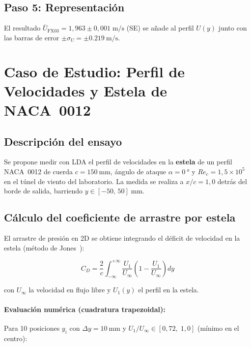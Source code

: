 \documentclass[12pt,a4paper]{article}
\begin{document}
\subsection{Paso 5: Representación}

El resultado $\bar{U}_\mathrm{FX03} = 1{,}963 \pm 0{,}001\;\si{\m\per\s}$
(SE) se añade al perfil $U(y)$ junto con las barras de error
$\pm\sigma_U = \pm\SI{0,219}{\m\per\s}$.

\section{Caso de Estudio: Perfil de Velocidades y Estela de NACA~0012}
\label{sec:caso_estudio}

\subsection{Descripción del ensayo}

Se propone medir con LDA el perfil de velocidades en la \textbf{estela} de
un perfil NACA~0012 de cuerda $c = \SI{150}{\mm}$, ángulo de ataque
$\alpha = \SI{0}{\degree}$ y $Re_c = 1{,}5\times10^5$ en el túnel de
viento del laboratorio.  La medida se realiza a $x/c = 1{,}0$ detrás del
borde de salida, barriendo $y \in [-50,\,50]\;\si{\mm}$.

\subsection{Cálculo del coeficiente de arrastre por estela}

El arrastre de presión en 2D se obtiene integrando el déficit de velocidad
en la estela (método de Jones~\cite{anderson2017}):

\begin{equation}
	C_D = \frac{2}{c}\int_{-\infty}^{+\infty}
	\frac{U_1}{U_\infty}\left(1 - \frac{U_1}{U_\infty}\right)dy
	\label{eq:CD_wake}
\end{equation}

con $U_\infty$ la velocidad en flujo libre y $U_1(y)$ el perfil en la
estela.

\paragraph{Evaluación numérica (cuadratura trapezoidal):}
Para 10 posiciones $y_i$ con $\Delta y = \SI{10}{\mm}$ y
$U_1/U_\infty \in [0{,}72,\; 1{,}0]$ (mínimo en el centro):
\end{document}
